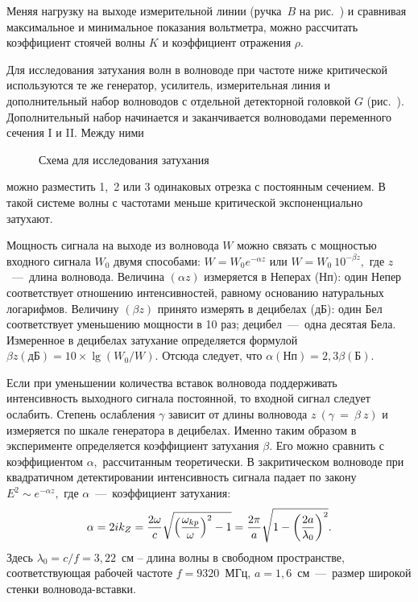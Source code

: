Меняя нагрузку на выходе измерительной линии (ручка~$B$ на рис.~) и сравнивая максимальное и минимальное показания вольтметра, можно рассчитать коэффициент стоячей волны $K$ и коэффициент отражения $\rho.$


Для исследования затухания волн в волноводе при частоте ниже критической используются те же генератор, усилитель, измерительная линия и дополнительный набор волноводов с отдельной детекторной головкой $G$ (рис.~). Дополнительный набор начинается и заканчивается волноводами переменного сечения I и II. Между ними

\begin{figure}[h!]
	\caption{Схема для исследования затухания}
\end{figure}

можно разместить 1,~2 или 3 одинаковых отрезка с постоянным сечением. В такой системе волны с частотами меньше критической экспоненциально затухают.

Мощность сигнала на выходе из волновода $W$ можно связать с мощностью входного сигнала $W_0$ двумя способами: $W=W_0e^{-\alpha z}$ или $W=W_0~10^{-\beta z},$ где $z$~---~длина волновода. Величина $(\alpha z)$ измеряется в Неперах (Нп): один Непер соответствует отношению интенсивностей, равному основанию натуральных логарифмов. Величину $(\beta z)$ принято измерять в децибелах (дБ): один Бел соответствует уменьшению мощности в 10 раз; децибел~---~одна десятая Бела. Измеренное в децибелах затухание определяется формулой $\beta z(\text{дБ})=10\times\lg(W_0/W).$ Отсюда следует, что $\alpha(\text{Нп})=2,3\beta(\text{Б}).$

Если при уменьшении количества вставок волновода поддерживать интенсивность выходного сигнала постоянной, то входной сигнал следует ослабить. Степень ослабления $\gamma$ зависит от длины волновода $z~(\gamma~=~\beta~z)$ и измеряется по шкале генератора в децибелах. Именно таким образом в эксперименте определяется коэффициент затухания $\beta.$ Его можно сравнить с коэффициентом $\alpha,$ рассчитанным теоретически. В закритическом волноводе при квадратичном детектировании интенсивность сигнала падает по закону $E^2\sim e^{-\alpha z},$ где $\alpha$~---~коэффициент затухания:
\begin{equation}
	\eqmark{2.0.7}
	\alpha=2ik_{Z}=\dfrac{2\omega}{c}\sqrt{\left(\dfrac{\omega_{kp}}{\omega}\right)^2-1}=\dfrac{2\pi}{a}\sqrt{1-\left(\dfrac{2a}{\lambda_0}\right)^2}.
\end{equation}
Здесь $\lambda_0=c/f=3,22$~см – длина волны в свободном пространстве, соответствующая рабочей частоте $f=9320$~МГц, $a=1,6$~см~---~размер широкой стенки волновода-вставки.

